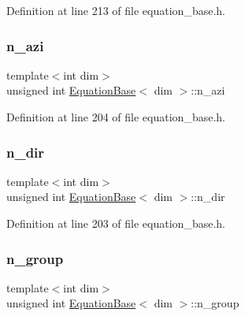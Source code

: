 Definition at line 213 of file equation\+\_\+base.\+h.

\mbox{\label{class_equation_base_a006861508fc71350aee8274fd949b1e6}} 
\subsubsection{\texorpdfstring{n\+\_\+azi}{n\_azi}}
{\footnotesize\ttfamily template$<$int dim$>$ \\
unsigned int \hyperlink{class_equation_base}{Equation\+Base}$<$ dim $>$\+::n\+\_\+azi\hspace{0.3cm}{\ttfamily [protected]}}



Definition at line 204 of file equation\+\_\+base.\+h.

\mbox{\label{class_equation_base_a7f01312245816bc60e1cf0a1630030a2}} 
\subsubsection{\texorpdfstring{n\+\_\+dir}{n\_dir}}
{\footnotesize\ttfamily template$<$int dim$>$ \\
unsigned int \hyperlink{class_equation_base}{Equation\+Base}$<$ dim $>$\+::n\+\_\+dir\hspace{0.3cm}{\ttfamily [protected]}}



Definition at line 203 of file equation\+\_\+base.\+h.

\mbox{\label{class_equation_base_adf5fc09a70820108fd273b0e2183db55}} 
\subsubsection{\texorpdfstring{n\+\_\+group}{n\_group}}
{\footnotesize\ttfamily template$<$int dim$>$ \\
unsigned int \hyperlink{class_equation_base}{Equation\+Base}$<$ dim $>$\+::n\+\_\+group\hspace{0.3cm}{\ttfamily [protected]}}



